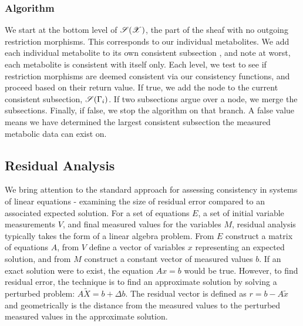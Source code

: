 \documentclass{article}
\begin{document}
\subsubsection{Algorithm}
We start at the bottom level of $\mathscr{S}(\mathscr{X})$, the part of the sheaf with no
outgoing restriction morphisms. This corresponds to our individual metabolites.
We add each individual metabolite to its own consistent subsection , and note
at worst, each metabolite is consistent with itself only. 
 Each level, we test to see if restriction morphisms
are deemed consistent via our consistency functions, and proceed based on
their return value. If true, we add the node to the current consistent
subsection, $\mathscr{S}(\Gamma_i)$. If two subsections argue over a node, we merge
the subsections. Finally, if false, we stop the algorithm on that branch.
A false value means we have determined the largest consistent subsection 
the measured metabolic data can exist on.

\subsection{Residual Analysis}
We bring attention to the standard approach for assessing consistency in
systems of linear equations - examining the size of residual error compared
to an associated expected solution. For a set of equations $E$, a set of
initial variable measurements $V$, and final measured values for the variables $M$, residual analysis
typically takes the form of a linear algebra problem. From $E$ construct
a matrix of equations $A$, from $V$ define a vector of variables $x$
representing an expected solution, and from $M$ construct 
a constant vector of measured values $b$. If an exact solution were to exist,
the equation $Ax = b$ would be true. However, to find residual error,
the technique is to find an approximate solution by solving a perturbed 
problem: $A \tilde{X} = b + \Delta b$. The residual vector is defined as $r=b-A\tilde{x}$
and geometrically is the distance from the measured values to the 
perturbed measured values in the approximate solution.
\end{document}
